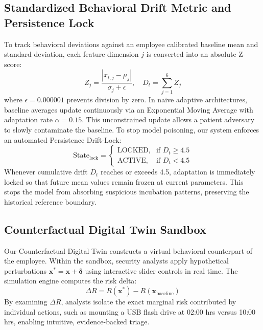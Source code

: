 \documentclass[conference]{IEEEtran}
\begin{document}
\subsection{Standardized Behavioral Drift Metric and Persistence Lock}
To track behavioral deviations against an employee calibrated baseline mean and standard deviation, each feature dimension $j$ is converted into an absolute Z-score:
\begin{equation}
Z_j = \frac{|x_{t,j} - \mu_j|}{\sigma_j + \epsilon}, \quad D_t = \sum_{j=1}^{6} Z_j
\label{eq:drift_calc}
\end{equation}
where $\epsilon = 0.000001$ prevents division by zero. In naive adaptive architectures, baseline averages update continuously via an Exponential Moving Average with adaptation rate $\alpha = 0.15$. This unconstrained update allows a patient adversary to slowly contaminate the baseline. To stop model poisoning, our system enforces an automated Persistence Drift-Lock:
\begin{equation}
\text{State}_{\text{lock}} = \begin{cases}
\text{LOCKED}, & \text{if } D_t \ge 4.5 \\
\text{ACTIVE}, & \text{if } D_t < 4.5
\end{cases}
\label{eq:drift_lock}
\end{equation}
Whenever cumulative drift $D_t$ reaches or exceeds 4.5, adaptation is immediately locked so that future mean values remain frozen at current parameters. This stops the model from absorbing suspicious incubation patterns, preserving the historical reference boundary.

\subsection{Counterfactual Digital Twin Sandbox}
Our Counterfactual Digital Twin constructs a virtual behavioral counterpart of the employee. Within the sandbox, security analysts apply hypothetical perturbations $\mathbf{x}^* = \mathbf{x} + \boldsymbol{\delta}$ using interactive slider controls in real time. The simulation engine computes the risk delta:
\begin{equation}
\Delta R = R(\mathbf{x}^*) - R(\mathbf{x}_{\text{baseline}})
\label{eq:counterfactual_delta}
\end{equation}
By examining $\Delta R$, analysts isolate the exact marginal risk contributed by individual actions, such as mounting a USB flash drive at 02:00 hrs versus 10:00 hrs, enabling intuitive, evidence-backed triage.
\end{document}
